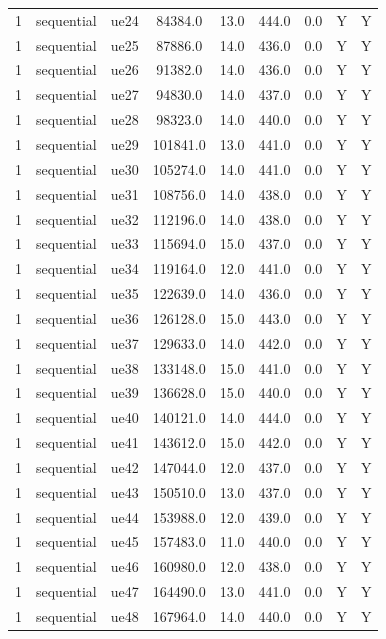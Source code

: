 \begin{table}[ht]
\begin{tabular}{|c|c|c|c|c|c|c|c|c|}
1 & sequential & ue24 & 84384.0 & 13.0 & 444.0 & 0.0 & Y & Y \\
1 & sequential & ue25 & 87886.0 & 14.0 & 436.0 & 0.0 & Y & Y \\
1 & sequential & ue26 & 91382.0 & 14.0 & 436.0 & 0.0 & Y & Y \\
1 & sequential & ue27 & 94830.0 & 14.0 & 437.0 & 0.0 & Y & Y \\
1 & sequential & ue28 & 98323.0 & 14.0 & 440.0 & 0.0 & Y & Y \\
1 & sequential & ue29 & 101841.0 & 13.0 & 441.0 & 0.0 & Y & Y \\
1 & sequential & ue30 & 105274.0 & 14.0 & 441.0 & 0.0 & Y & Y \\
1 & sequential & ue31 & 108756.0 & 14.0 & 438.0 & 0.0 & Y & Y \\
1 & sequential & ue32 & 112196.0 & 14.0 & 438.0 & 0.0 & Y & Y \\
1 & sequential & ue33 & 115694.0 & 15.0 & 437.0 & 0.0 & Y & Y \\
1 & sequential & ue34 & 119164.0 & 12.0 & 441.0 & 0.0 & Y & Y \\
1 & sequential & ue35 & 122639.0 & 14.0 & 436.0 & 0.0 & Y & Y \\
1 & sequential & ue36 & 126128.0 & 15.0 & 443.0 & 0.0 & Y & Y \\
1 & sequential & ue37 & 129633.0 & 14.0 & 442.0 & 0.0 & Y & Y \\
1 & sequential & ue38 & 133148.0 & 15.0 & 441.0 & 0.0 & Y & Y \\
1 & sequential & ue39 & 136628.0 & 15.0 & 440.0 & 0.0 & Y & Y \\
1 & sequential & ue40 & 140121.0 & 14.0 & 444.0 & 0.0 & Y & Y \\
1 & sequential & ue41 & 143612.0 & 15.0 & 442.0 & 0.0 & Y & Y \\
1 & sequential & ue42 & 147044.0 & 12.0 & 437.0 & 0.0 & Y & Y \\
1 & sequential & ue43 & 150510.0 & 13.0 & 437.0 & 0.0 & Y & Y \\
1 & sequential & ue44 & 153988.0 & 12.0 & 439.0 & 0.0 & Y & Y \\
1 & sequential & ue45 & 157483.0 & 11.0 & 440.0 & 0.0 & Y & Y \\
1 & sequential & ue46 & 160980.0 & 12.0 & 438.0 & 0.0 & Y & Y \\
1 & sequential & ue47 & 164490.0 & 13.0 & 441.0 & 0.0 & Y & Y \\
1 & sequential & ue48 & 167964.0 & 14.0 & 440.0 & 0.0 & Y & Y \\

\end{tabular}
\end{table}
